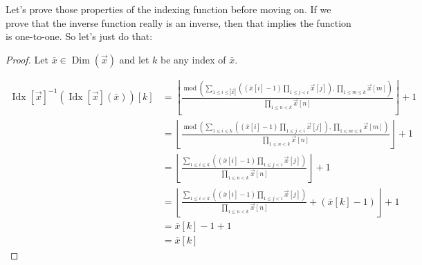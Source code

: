 \documentclass[12pt]{book}
\theoremstyle{plain}
\theoremstyle{definition}
\theoremstyle{ppart}
\theoremstyle{case}
\theoremstyle{solution}
\DeclareMathOperator{\Dim}{Dim}
\DeclareMathOperator{\remainder}{mod}
\DeclareMathOperator{\Idx}{Idx}
\newcommand{\shape}[1]{\left|#1\right|}
\begin{document}
\begin{landscape}
Let's prove those properties of the indexing function before moving on. If we prove that the inverse function
really is an inverse, then that implies the function is one-to-one. So let's just do that:

\begin{proof}
Let $\bar{x} \in \Dim(\vec{x})$ and let $k$ be any index of $\bar{x}$.

\begin{align*}
  \Idx[\vec{x}]^{-1}(\Idx[\vec{x}](\bar{x}))[k] &= 
  \left\lfloor
    \frac{\remainder\left(
      \sum_{1 \le i \le \shape{\vec{x}}} \left( (\bar{x}[i]-1) \prod_{1 \le j < i} \vec{x}[j] \right) 
      , \prod_{1 \le m \le k} \vec{x}[m]\right)}
    {\prod_{1 \le n < k} \vec{x}[n]}
  \right\rfloor + 1 \\
  &=
  \left\lfloor
    \frac{\remainder\left(
      \sum_{1 \le i \le k} \left( (\bar{x}[i]-1) \prod_{1 \le j < i} \vec{x}[j] \right) 
      , \prod_{1 \le m \le k} \vec{x}[m]\right)}
    {\prod_{1 \le n < k} \vec{x}[n]}
  \right\rfloor + 1 \\
  &=
  \left\lfloor
    \frac{
      \sum_{1 \le i \le k} \left( (\bar{x}[i]-1) \prod_{1 \le j < i} \vec{x}[j] \right) 
    }
    {\prod_{1 \le n < k} \vec{x}[n]}
  \right\rfloor + 1 \\
  &=
  \left\lfloor
    \frac{
      \sum_{1 \le i < k} \left( (\bar{x}[i]-1) \prod_{1 \le j < i} \vec{x}[j] \right) 
    }
    {\prod_{1 \le n < k} \vec{x}[n]}
    +
    (\bar{x}[k]-1)
  \right\rfloor + 1 \\
  &= \bar{x}[k]-1+1 \\
  &= \bar{x}[k]
\end{align*}


\end{proof}
\end{landscape}
\end{document}
